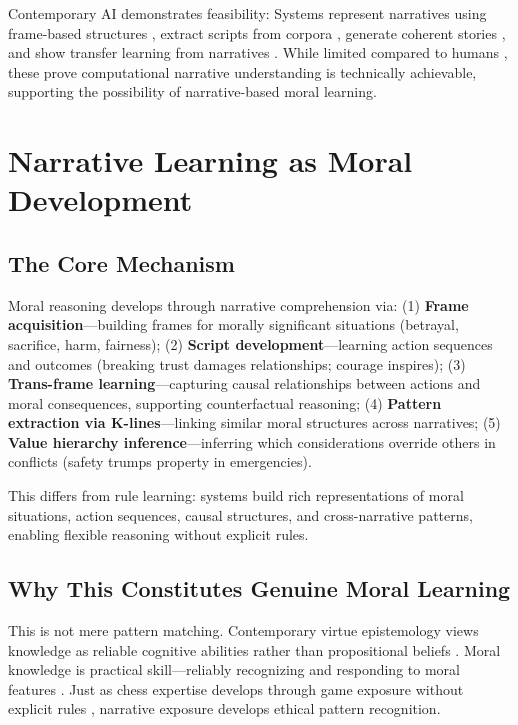 \documentclass[12pt]{article}
\begin{document}
Contemporary AI demonstrates feasibility: Systems represent narratives using frame-based structures \citep{mueller2003story}, extract scripts from corpora \citep{chambers2008unsupervised}, generate coherent stories \citep{riedl2010narrative}, and show transfer learning from narratives \citep{brown2020language}. While limited compared to humans \citep{sap2019socialiqa}, these prove computational narrative understanding is technically achievable, supporting the possibility of narrative-based moral learning.

\section{Narrative Learning as Moral Development}

\subsection{The Core Mechanism}

Moral reasoning develops through narrative comprehension via: (1) \textbf{Frame acquisition}---building frames for morally significant situations (betrayal, sacrifice, harm, fairness); (2) \textbf{Script development}---learning action sequences and outcomes (breaking trust damages relationships; courage inspires); (3) \textbf{Trans-frame learning}---capturing causal relationships between actions and moral consequences, supporting counterfactual reasoning; (4) \textbf{Pattern extraction via K-lines}---linking similar moral structures across narratives; (5) \textbf{Value hierarchy inference}---inferring which considerations override others in conflicts (safety trumps property in emergencies).

This differs from rule learning: systems build rich representations of moral situations, action sequences, causal structures, and cross-narrative patterns, enabling flexible reasoning without explicit rules.

\subsection{Why This Constitutes Genuine Moral Learning}

This is not mere pattern matching. Contemporary virtue epistemology views knowledge as reliable cognitive abilities rather than propositional beliefs \citep{sosa2007apt, greco2010achievements}. Moral knowledge is practical skill---reliably recognizing and responding to moral features \citep{dreyfus2000could, ryle1949concept}. Just as chess expertise develops through game exposure without explicit rules \citep{chase1973perception}, narrative exposure develops ethical pattern recognition.
\end{document}
